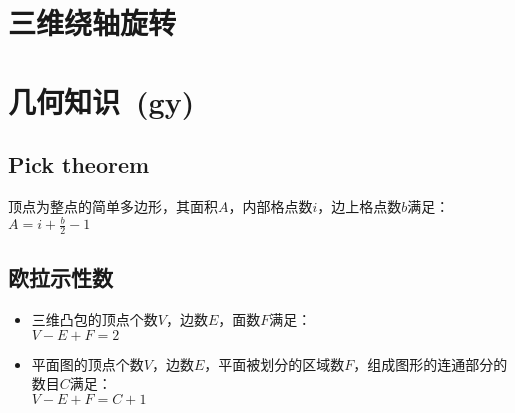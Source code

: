 \section{三维绕轴旋转}
\section{几何知识\ \small(gy)}
	\subsection*{Pick theorem}
		顶点为整点的简单多边形，其面积$ A $，内部格点数$ i $，边上格点数$ b $满足：
		\\$ A = i + \frac{b}{2} - 1 $
	\subsection*{欧拉示性数}
		\begin{itemize}
			\item 三维凸包的顶点个数$ V $，边数$ E $，面数$ F $满足：
			\\$ V - E + F = 2 $
			\item 平面图的顶点个数$ V $，边数$ E $，平面被划分的区域数$ F $，组成图形的连通部分的数目$ C $满足：
			\\$ V - E + F = C + 1 $
		\end{itemize}
